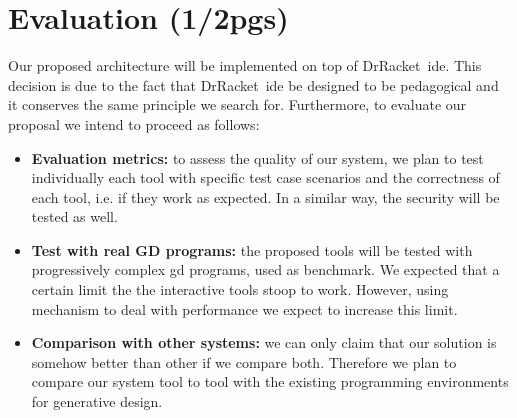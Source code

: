 
% 
% 

\section{Evaluation (1/2pgs)}

Our proposed architecture will be implemented on top of DrRacket~\ac{ide}. This decision is due to the fact that DrRacket~\ac{ide} be designed to be pedagogical and it conserves the same principle we search for. Furthermore, to evaluate our proposal we intend to proceed as follows:

\begin{itemize}
\item \textbf{Evaluation metrics:} to assess the quality of our system, we plan to test individually each tool with specific test case scenarios and the correctness of each tool, i.e. if they work as expected. In a similar way, the security will be tested as well.

\item \textbf{Test with real GD programs:} the proposed tools will be tested  with progressively complex \ac{gd} programs, used as benchmark. We expected that a certain limit the the interactive tools stoop to work. However, using mechanism to deal with performance we expect to increase this limit.

\item \textbf{Comparison with other systems:} we can only claim that our solution is somehow better than other if we compare both. Therefore we plan to compare our system tool to tool with the existing programming environments for generative design. 
\end{itemize}